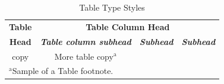 \documentclass[conference]{IEEEtran}
\begin{document}
\begin{table}[htbp]
\caption{Table Type Styles}
\begin{center}
\begin{tabular}{|c|c|c|c|}
\hline
\textbf{Table}&\multicolumn{3}{|c|}{\textbf{Table Column Head}} \\
\cline{2-4} 
\textbf{Head} & \textbf{\textit{Table column subhead}}& \textbf{\textit{Subhead}}& \textbf{\textit{Subhead}} \\
\hline
copy& More table copy$^{\mathrm{a}}$& &  \\
\hline
\multicolumn{4}{l}{$^{\mathrm{a}}$Sample of a Table footnote.}
\end{tabular}
\label{tab1}
\end{center}
\end{table}
\end{document}
